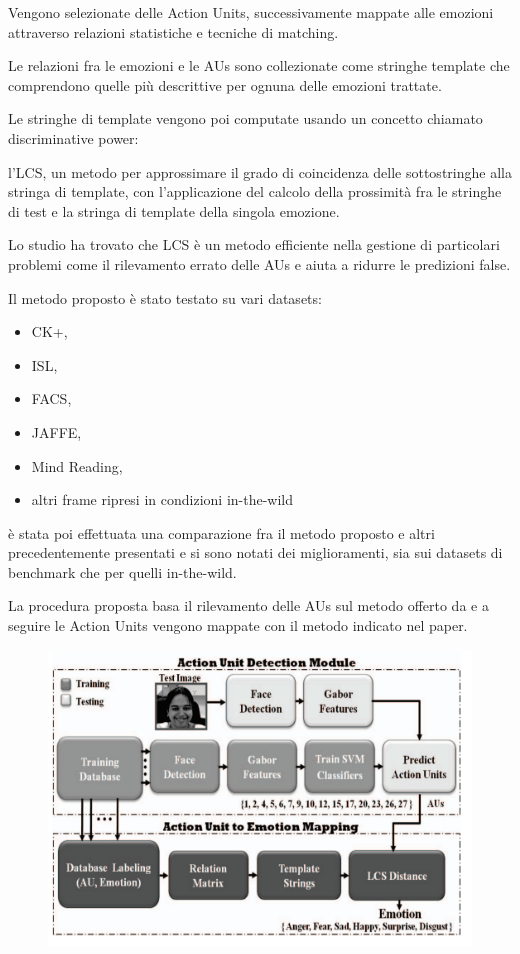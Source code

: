 Vengono selezionate delle Action Units, successivamente mappate alle emozioni attraverso relazioni statistiche e tecniche di matching.

Le relazioni fra le emozioni e le AUs sono collezionate come stringhe template che comprendono quelle più descrittive per ognuna delle emozioni trattate.

Le stringhe di template vengono poi computate usando un concetto chiamato discriminative power:

l’LCS, un metodo per approssimare il grado di coincidenza delle sottostringhe alla stringa di template, con l’applicazione del calcolo della prossimità fra le stringhe di test e la stringa di template della singola emozione.

Lo studio ha trovato che LCS è un metodo efficiente nella gestione di particolari problemi come il rilevamento errato delle AUs e aiuta a ridurre le predizioni false.

Il metodo proposto è stato testato su vari datasets:
\begin{itemize}
    \item CK+,
    \item ISL,
    \item FACS,
    \item JAFFE,
    \item Mind Reading,
    \item altri frame ripresi in condizioni in-the-wild
\end{itemize}

è stata poi effettuata una comparazione fra il metodo proposto e altri precedentemente presentati e si sono notati dei miglioramenti, sia sui datasets di benchmark che per quelli in-the-wild.\newpage

La procedura proposta basa il rilevamento delle AUs sul metodo offerto da \cite{RecoFaceExprMachLearnAppSpontBehav} e a seguire le Action Units vengono mappate con il metodo indicato nel paper.
\begin{figure}
    \begin{center}    
        \includegraphics[width=0.7\linewidth]{images/18.png}
    \end{center}
\end{figure}

